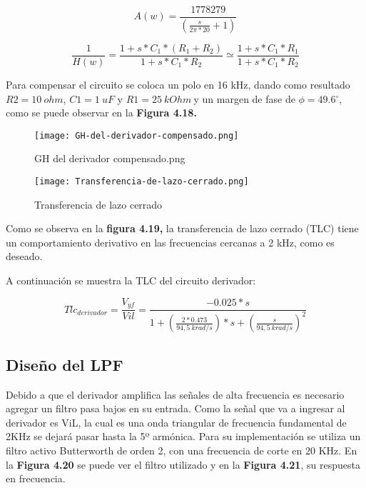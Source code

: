\begin{equation} \label{eq_Vyf-lineal}
	A(w)=\frac{1778279}{(\frac{s}{2\pi *20}+1)}
\end{equation} 

\begin{equation} \label{eq_Vyf-lineal}
	\frac{1}{H(w)}=\frac{1+s*C_1*(R_1+R_2)}{1+s*C_1*R_2}\simeq \frac{1+s*C_1*R_1}{1+s*C_1*R_2}
\end{equation}

\noindent Para compensar el circuito se coloca un polo en 16 kHz, dando como resultado $R2=10\ ohm$, $C1=1\ uF$ y $R1=25\ kOhm\ $y un margen de fase de $\phi =49.6{}^\circ $, como se puede observar en la \textbf{Figura 4.18.}

\begin{figure}[H]
	\centering
	\texttt{[image: GH-del-derivador-compensado.png]}
	\caption{GH del derivador compensado.png}
	\label{fig:img_GH del derivador compensado}
\end{figure}

\begin{figure}[H]
	\centering
	\texttt{[image: Transferencia-de-lazo-cerrado.png]}
	\caption{Transferencia de lazo cerrado}
	\label{fig:img_Transferencia-de-lazo-cerrado}
\end{figure}

\noindent Como se observa en la \textbf{figura 4.19, }la transferencia de lazo cerrado (TLC) tiene un comportamiento derivativo en las frecuencias cercanas a 2 kHz, como es deseado.

\noindent A continuaci\'{o}n se muestra la TLC del circuito derivador:
 
\begin{equation} \label{eq_Vyf-lineal}
	{Tlc}_{derivador}=\frac{V_{yf}}{Vil}=\frac{-0.025*s}{1+(\frac{2*0.473}{94,5\ krad/s})*s+(\frac{s}{94,5\ krad/s})^2}
\end{equation} 

\subsection{Dise\~{n}o del LPF}

\noindent Debido a que el derivador amplifica las se\~{n}ales de alta frecuencia es necesario agregar un filtro pasa bajos en su entrada. Como la se\~{n}al que va a ingresar al derivador es ViL, la cual es una onda triangular de frecuencia fundamental de 2KHz se dejar\'{a} pasar hasta la 5º arm\'{o}nica. Para su implementaci\'{o}n se utiliza un filtro activo Butterworth de orden 2, con una frecuencia de corte en 20 KHz. En la \textbf{Figura 4.20 }se puede ver el filtro utilizado y en la \textbf{Figura 4.21}, su respuesta en frecuencia.

